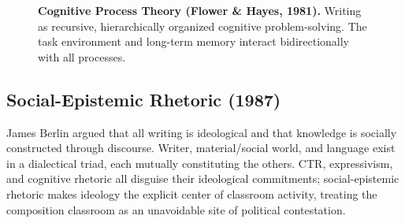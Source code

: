 \documentclass[12pt]{article}
\begin{document}
\begin{figure}[H]
\caption{\textbf{Cognitive Process Theory (Flower \& Hayes, 1981).} Writing as recursive, hierarchically organized cognitive problem-solving. The task environment and long-term memory interact bidirectionally with all processes.}
\label{fig:cognitive-model}
\end{figure}

\subsection{Social-Epistemic Rhetoric (1987)}

James Berlin argued that all writing is ideological and that knowledge is socially constructed through discourse. Writer, material/social world, and language exist in a dialectical triad, each mutually constituting the others. CTR, expressivism, and cognitive rhetoric all disguise their ideological commitments; social-epistemic rhetoric makes ideology the explicit center of classroom activity, treating the composition classroom as an unavoidable site of political contestation.
\end{document}
